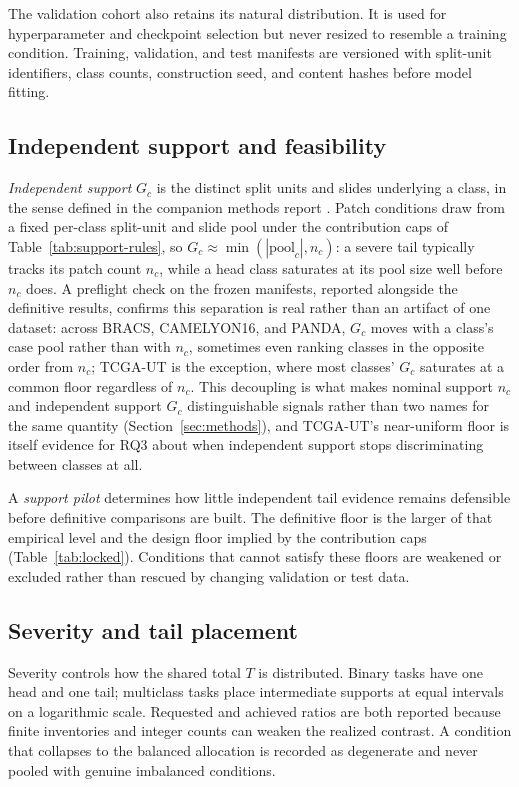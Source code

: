 \documentclass[11pt]{article}
\begin{document}
The validation cohort also retains its natural distribution. It is used for hyperparameter and checkpoint selection but never resized to resemble a training condition. Training, validation, and test manifests are versioned with split-unit identifiers, class counts, construction seed, and content hashes before model fitting.

\subsection{Independent support and feasibility}
\label{sec:independent-support}
\emph{Independent support} $G_c$ is the distinct split units and slides underlying a class, in the sense defined in the companion methods report \citep{queisler2026imbalanceMethods}. Patch conditions draw from a fixed per-class split-unit and slide pool under the contribution caps of Table~\ref{tab:support-rules}, so $G_c\approx\min(|\mathrm{pool}_c|,n_c)$: a severe tail typically tracks its patch count $n_c$, while a head class saturates at its pool size well before $n_c$ does. A preflight check on the frozen manifests, reported alongside the definitive results, confirms this separation is real rather than an artifact of one dataset: across BRACS, CAMELYON16, and PANDA, $G_c$ moves with a class's case pool rather than with $n_c$, sometimes even ranking classes in the opposite order from $n_c$; TCGA-UT is the exception, where most classes' $G_c$ saturates at a common floor regardless of $n_c$. This decoupling is what makes nominal support $n_c$ and independent support $G_c$ distinguishable signals rather than two names for the same quantity (Section~\ref{sec:methods}), and TCGA-UT's near-uniform floor is itself evidence for RQ3 about when independent support stops discriminating between classes at all.

A \emph{support pilot} determines how little independent tail evidence remains defensible before definitive comparisons are built. The definitive floor is the larger of that empirical level and the design floor implied by the contribution caps (Table~\ref{tab:locked}). Conditions that cannot satisfy these floors are weakened or excluded rather than rescued by changing validation or test data.

\subsection{Severity and tail placement}
Severity controls how the shared total $T$ is distributed. Binary tasks have one head and one tail; multiclass tasks place intermediate supports at equal intervals on a logarithmic scale. Requested and achieved ratios are both reported because finite inventories and integer counts can weaken the realized contrast. A condition that collapses to the balanced allocation is recorded as degenerate and never pooled with genuine imbalanced conditions.
\end{document}
